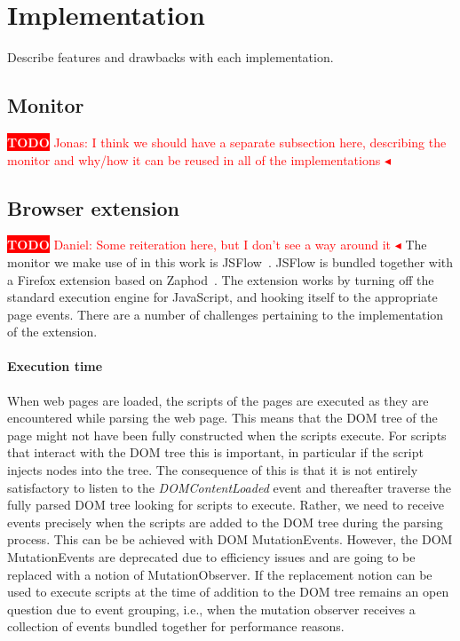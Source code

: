 \documentclass{llncs}
\newcommand{\todo}[1]{\colorbox{red}{\textcolor{white}{\sffamily\bfseries\scriptsize TODO}} \textcolor{red}{#1} \textcolor{red}{$\blacktriangleleft$}}
\begin{document}
\section{Implementation}
\label{sec:impl}

Describe features and drawbacks with each implementation.

\subsection{Monitor}
\todo{Jonas: I think we should have a separate subsection here, describing the monitor and why/how it can be reused in all of the implementations}


\subsection{Browser extension}
%
\todo{Daniel: Some reiteration here, but I don't see a way around it} The
monitor we make use of in this work is JSFlow~\cite{JSFLow}. JSFlow is bundled
together with a Firefox extension based on Zaphod~\cite{Zaphod}. The extension
works by turning off the standard execution engine for JavaScript, and hooking
itself to the appropriate page events. There are a number of challenges
pertaining to the implementation of the extension.

\paragraph{Execution time}

When web pages are loaded, the scripts of the pages are executed as they are
encountered while parsing the web page. This means that the DOM tree of the
page might not have been fully constructed when the scripts execute.  For
scripts that interact with the DOM tree this is important, in particular if the
script injects nodes into the tree. The consequence of this is that it is not
entirely satisfactory to listen to the \emph{DOMContentLoaded} event and
thereafter traverse the fully parsed DOM tree looking for scripts to execute.
Rather, we need to receive events precisely when the scripts are added to the
DOM tree during the parsing process. This can be be achieved with DOM
MutationEvents. However, the DOM MutationEvents are deprecated due to
efficiency issues and are going to be replaced with a notion of
MutationObserver.  If the replacement notion can be used to execute scripts at
the time of addition to the DOM tree remains an open question due to event
grouping, i.e., when the mutation observer receives a collection of events
bundled together for performance reasons. 
\end{document}
